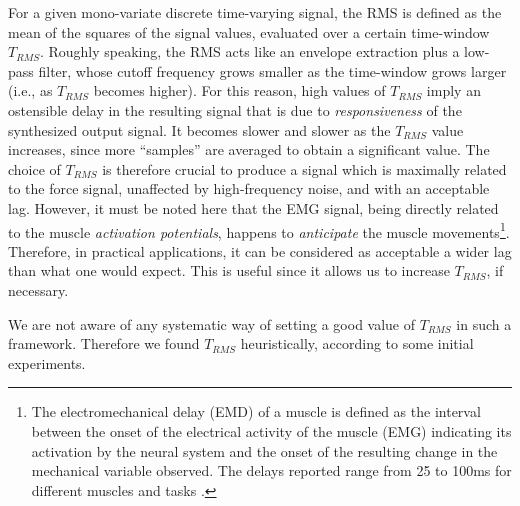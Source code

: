 For a given mono-variate discrete time-varying signal, the RMS is
defined as the mean of the squares of the signal values, evaluated
over a certain time-window $T_{RMS}$. Roughly speaking, the RMS acts
like an envelope extraction plus a low-pass filter, whose cutoff
frequency grows smaller as the time-window grows larger (i.e., as
$T_{RMS}$ becomes higher). For this reason, high values of $T_{RMS}$
imply an ostensible delay in the resulting signal that is due to
\emph{responsiveness} of the synthesized output signal.  It becomes
slower and slower as the $T_{RMS}$ value increases, since more
``samples'' are averaged to obtain a significant value. The choice of
$T_{RMS}$ is therefore crucial to produce a signal which is maximally
related to the force signal, unaffected by high-frequency noise, and
with an acceptable lag. However, it must be noted here that the EMG
signal, being directly related to the muscle \emph{activation
potentials}, happens to \emph{anticipate} the muscle
movements\footnote{The electromechanical delay (EMD) of a muscle is
defined as the interval between the onset of the electrical activity
of the muscle (EMG) indicating its activation by the neural system and
the onset of the resulting change in the mechanical variable
observed. The delays reported range from 25 to 100ms for different
muscles and tasks \cite{Wolf1994}.}. Therefore, in practical
applications, it can be considered as acceptable a wider lag than what
one would expect.
This is useful since it allows us to increase $T_{RMS}$, if necessary.


We are not aware of any systematic way of setting a good value of
$T_{RMS}$ in such a framework. Therefore we found $T_{RMS}$
heuristically, according to some initial experiments.

